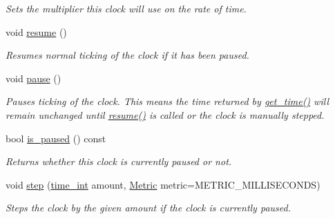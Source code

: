 \begin{DoxyCompactItemize}
\begin{DoxyCompactList}\small\item\em Sets the multiplier this clock will use on the rate of time. \end{DoxyCompactList}\item 
void \hyperlink{classomi_1_1runtime_1_1_abstract_clock_a2e86653313c678dbd25db870405a89ba}{resume} ()
\begin{DoxyCompactList}\small\item\em Resumes normal ticking of the clock if it has been paused. \end{DoxyCompactList}\item 
\hypertarget{classomi_1_1runtime_1_1_abstract_clock_af5f62abc082be6ee53d4d7a6cf0912a3}{}void \hyperlink{classomi_1_1runtime_1_1_abstract_clock_af5f62abc082be6ee53d4d7a6cf0912a3}{pause} ()\label{classomi_1_1runtime_1_1_abstract_clock_af5f62abc082be6ee53d4d7a6cf0912a3}

\begin{DoxyCompactList}\small\item\em Pauses ticking of the clock. This means the time returned by \hyperlink{classomi_1_1runtime_1_1_abstract_clock_ab504674ae140328a3a4dd3a2b02b89c8}{get\+\_\+time()} will remain unchanged until \hyperlink{classomi_1_1runtime_1_1_abstract_clock_a2e86653313c678dbd25db870405a89ba}{resume()} is called or the clock is manually stepped. \end{DoxyCompactList}\item 
\hypertarget{classomi_1_1runtime_1_1_abstract_clock_ac7674af8453a01e81a929fbd45e871bf}{}bool \hyperlink{classomi_1_1runtime_1_1_abstract_clock_ac7674af8453a01e81a929fbd45e871bf}{is\+\_\+paused} () const \label{classomi_1_1runtime_1_1_abstract_clock_ac7674af8453a01e81a929fbd45e871bf}

\begin{DoxyCompactList}\small\item\em Returns whether this clock is currently paused or not. \end{DoxyCompactList}\item 
void \hyperlink{classomi_1_1runtime_1_1_abstract_clock_acba0e258c160ec6a19477f8558af19d7}{step} (\hyperlink{classomi_1_1runtime_1_1_abstract_clock_af2122541388aea885afc08e8135340f7}{time\+\_\+int} amount, \hyperlink{classomi_1_1runtime_1_1_abstract_clock_a6af6e30a02165469ffcdcbd512d47a1b}{Metric} metric=M\+E\+T\+R\+I\+C\+\_\+\+M\+I\+L\+L\+I\+S\+E\+C\+O\+N\+D\+S)
\begin{DoxyCompactList}\small\item\em Steps the clock by the given amount if the clock is currently paused. \end{DoxyCompactList}\end{DoxyCompactItemize}
